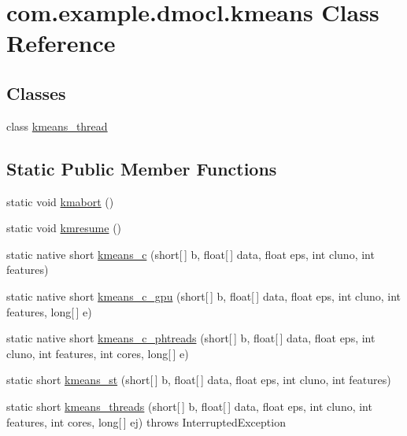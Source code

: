 \hypertarget{classcom_1_1example_1_1dmocl_1_1kmeans}{}\section{com.\+example.\+dmocl.\+kmeans Class Reference}
\label{classcom_1_1example_1_1dmocl_1_1kmeans}
\subsection*{Classes}
\begin{DoxyCompactItemize}
\item 
class \mbox{\hyperlink{classcom_1_1example_1_1dmocl_1_1kmeans_1_1kmeans__thread}{kmeans\+\_\+thread}}
\end{DoxyCompactItemize}
\subsection*{Static Public Member Functions}
\begin{DoxyCompactItemize}
\item 
static void \mbox{\hyperlink{classcom_1_1example_1_1dmocl_1_1kmeans_a8a721ea7f32bd548c7e1bd51eb7d18eb}{kmabort}} ()
\item 
static void \mbox{\hyperlink{classcom_1_1example_1_1dmocl_1_1kmeans_a5ba1945e6b7756886fd7a96babe493b7}{kmresume}} ()
\item 
static native short \mbox{\hyperlink{classcom_1_1example_1_1dmocl_1_1kmeans_a625b4b50289fb4b70df9f5e75d0171cc}{kmeans\+\_\+c}} (short\mbox{[}$\,$\mbox{]} b, float\mbox{[}$\,$\mbox{]} data, float eps, int cluno, int features)
\item 
static native short \mbox{\hyperlink{classcom_1_1example_1_1dmocl_1_1kmeans_afc49721ef1764e59e83082eb30e913b0}{kmeans\+\_\+c\+\_\+gpu}} (short\mbox{[}$\,$\mbox{]} b, float\mbox{[}$\,$\mbox{]} data, float eps, int cluno, int features, long\mbox{[}$\,$\mbox{]} e)
\item 
static native short \mbox{\hyperlink{classcom_1_1example_1_1dmocl_1_1kmeans_a87c0e078ffcfec39078fe9caf504af1e}{kmeans\+\_\+c\+\_\+phtreads}} (short\mbox{[}$\,$\mbox{]} b, float\mbox{[}$\,$\mbox{]} data, float eps, int cluno, int features, int cores, long\mbox{[}$\,$\mbox{]} e)
\item 
static short \mbox{\hyperlink{classcom_1_1example_1_1dmocl_1_1kmeans_a589995b7517109b01302666587ace215}{kmeans\+\_\+st}} (short\mbox{[}$\,$\mbox{]} b, float\mbox{[}$\,$\mbox{]} data, float eps, int cluno, int features)
\item 
static short \mbox{\hyperlink{classcom_1_1example_1_1dmocl_1_1kmeans_a9d1125246428c8ec0569608c88f1c7b7}{kmeans\+\_\+threads}} (short\mbox{[}$\,$\mbox{]} b, float\mbox{[}$\,$\mbox{]} data, float eps, int cluno, int features, int cores, long\mbox{[}$\,$\mbox{]} ej)  throws Interrupted\+Exception 
\end{DoxyCompactItemize}
